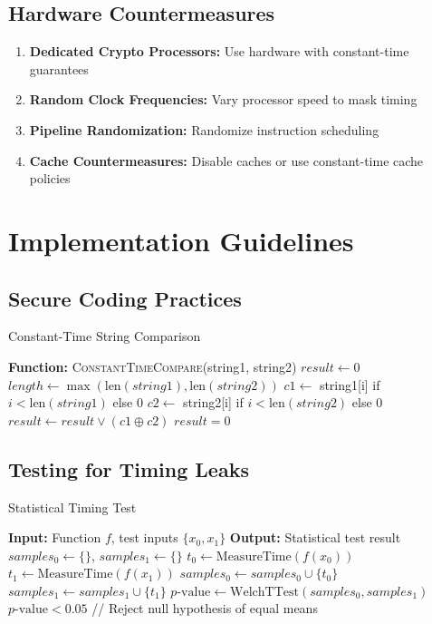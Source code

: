 \documentclass[12pt,a4paper]{article}
\theoremstyle{definition}
\begin{document}
\subsection{Hardware Countermeasures}

\begin{enumerate}
    \item \textbf{Dedicated Crypto Processors:} Use hardware with constant-time guarantees
    \item \textbf{Random Clock Frequencies:} Vary processor speed to mask timing
    \item \textbf{Pipeline Randomization:} Randomize instruction scheduling
    \item \textbf{Cache Countermeasures:} Disable caches or use constant-time cache policies
\end{enumerate}

\section{Implementation Guidelines}

\subsection{Secure Coding Practices}

\begin{algorithmbox}{Constant-Time String Comparison}
\begin{algorithmic}
\STATE \textbf{Function:} \textsc{ConstantTimeCompare}(string1, string2)
\STATE $result \leftarrow 0$
\STATE $length \leftarrow \max(\text{len}(string1), \text{len}(string2))$
    \STATE $c1 \leftarrow$ string1[i] if $i < \text{len}(string1)$ else $0$
    \STATE $c2 \leftarrow$ string2[i] if $i < \text{len}(string2)$ else $0$
    \STATE $result \leftarrow result \lor (c1 \oplus c2)$
\ENDFOR
\RETURN $result = 0$
\end{algorithmic}
\end{algorithmbox}

\subsection{Testing for Timing Leaks}

\begin{algorithmbox}{Statistical Timing Test}
\begin{algorithmic}
\STATE \textbf{Input:} Function $f$, test inputs $\{x_0, x_1\}$
\STATE \textbf{Output:} Statistical test result
\STATE $samples_0 \leftarrow \{\}$, $samples_1 \leftarrow \{\}$
    \STATE $t_0 \leftarrow \text{MeasureTime}(f(x_0))$
    \STATE $t_1 \leftarrow \text{MeasureTime}(f(x_1))$
    \STATE $samples_0 \leftarrow samples_0 \cup \{t_0\}$
    \STATE $samples_1 \leftarrow samples_1 \cup \{t_1\}$
\ENDFOR
\STATE $p\text{-value} \leftarrow \text{WelchTTest}(samples_0, samples_1)$
\RETURN $p\text{-value} < 0.05$ \quad // Reject null hypothesis of equal means
\end{algorithmic}
\end{algorithmbox}
\end{document}
